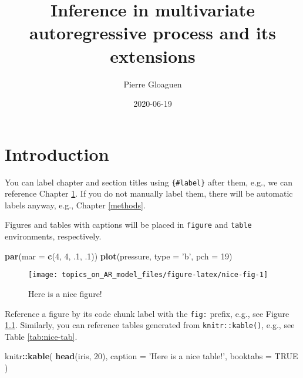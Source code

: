 \documentclass[]{book}
\title{Inference in multivariate autoregressive process and its extensions}
\author{Pierre Gloaguen}
\date{2020-06-19}
\newenvironment{Shaded}{\begin{snugshade}}{\end{snugshade}}
\newcommand{\KeywordTok}[1]{\textcolor[rgb]{0.13,0.29,0.53}{\textbf{#1}}}
\newcommand{\DataTypeTok}[1]{\textcolor[rgb]{0.13,0.29,0.53}{#1}}
\newcommand{\DecValTok}[1]{\textcolor[rgb]{0.00,0.00,0.81}{#1}}
\newcommand{\StringTok}[1]{\textcolor[rgb]{0.31,0.60,0.02}{#1}}
\newcommand{\OtherTok}[1]{\textcolor[rgb]{0.56,0.35,0.01}{#1}}
\newcommand{\OperatorTok}[1]{\textcolor[rgb]{0.81,0.36,0.00}{\textbf{#1}}}
\newcommand{\NormalTok}[1]{#1}
\begin{document}
\maketitle

{
\setcounter{tocdepth}{1}
\tableofcontents
}
\chapter{Introduction}\label{intro}

You can label chapter and section titles using \texttt{\{\#label\}}
after them, e.g., we can reference Chapter \ref{intro}. If you do not
manually label them, there will be automatic labels anyway, e.g.,
Chapter \ref{methods}.

Figures and tables with captions will be placed in \texttt{figure} and
\texttt{table} environments, respectively.

\begin{Shaded}
\begin{Highlighting}[]
\KeywordTok{par}\NormalTok{(}\DataTypeTok{mar =} \KeywordTok{c}\NormalTok{(}\DecValTok{4}\NormalTok{, }\DecValTok{4}\NormalTok{, .}\DecValTok{1}\NormalTok{, .}\DecValTok{1}\NormalTok{))}
\KeywordTok{plot}\NormalTok{(pressure, }\DataTypeTok{type =} \StringTok{'b'}\NormalTok{, }\DataTypeTok{pch =} \DecValTok{19}\NormalTok{)}
\end{Highlighting}
\end{Shaded}

\begin{figure}

{\centering \texttt{[image: topics\_on\_AR\_model\_files/figure-latex/nice-fig-1]} 

}

\caption{Here is a nice figure!}\label{fig:nice-fig}
\end{figure}

Reference a figure by its code chunk label with the \texttt{fig:}
prefix, e.g., see Figure \ref{fig:nice-fig}. Similarly, you can
reference tables generated from \texttt{knitr::kable()}, e.g., see Table
\ref{tab:nice-tab}.

\begin{Shaded}
\begin{Highlighting}[]
\NormalTok{knitr}\OperatorTok{::}\KeywordTok{kable}\NormalTok{(}
  \KeywordTok{head}\NormalTok{(iris, }\DecValTok{20}\NormalTok{), }\DataTypeTok{caption =} \StringTok{'Here is a nice table!'}\NormalTok{,}
  \DataTypeTok{booktabs =} \OtherTok{TRUE}
\NormalTok{)}
\end{Highlighting}
\end{Shaded}
\end{document}
